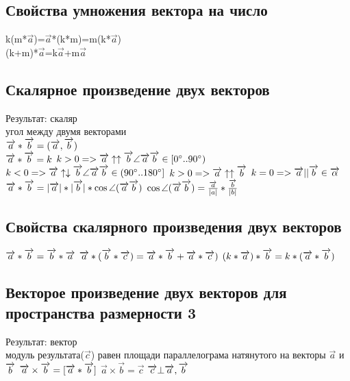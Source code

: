 \documentclass{book}
\begin{document}
\subsection{Свойства умножения вектора на число}
k(m*$\overrightarrow{a}$)=$\overrightarrow{a}$*(k*m)=m(k*$\overrightarrow{a}$)\\
(k+m)*$\overrightarrow{a}$=k$\overrightarrow{a}$+m$\overrightarrow{a}$\\
\subsection{Скалярное произведение двух векторов}
Результат: скаляр\\
угол между двумя векторами\\
$\overrightarrow{a}*\overrightarrow{b}=(\overrightarrow{a},\overrightarrow{b})\\$
\\
$\overrightarrow{a}*\overrightarrow{b}=k\\$
$k>0 => \overrightarrow{a}\uparrow\uparrow\overrightarrow{b}   \angle\overrightarrow{a}\overrightarrow{b}\in[0^\circ..90^\circ)\\$
$k<0 => \overrightarrow{a}\uparrow\downarrow\overrightarrow{b}   \angle\overrightarrow{a}\overrightarrow{b}\in(90^\circ..180^\circ]\\$
$k>0 => \overrightarrow{a}\uparrow\uparrow\overrightarrow{b}\\$
$k=0 => \overrightarrow{a}||\overrightarrow{b}\in \overrightarrow{\alpha }\\$
$\overrightarrow{a}*\overrightarrow{b}=|\overrightarrow{a}|*|\overrightarrow{b}|*\cos\angle(\overrightarrow{a}\overrightarrow{b})\\$
$\cos\angle(\overrightarrow{a}\overrightarrow{b}) = \frac{\overrightarrow{a}}{|a|}*\frac{\overrightarrow{b}}{|b|}\\$
\subsection{Свойства скалярного произведения двух векторов}
$\overrightarrow{a}*\overrightarrow{b}=\overrightarrow{b}*\overrightarrow{a}\\$
$\overrightarrow{a}*(\overrightarrow{b}*\overrightarrow{c})=\overrightarrow{a}*\overrightarrow{b}+\overrightarrow{a}*\overrightarrow{c})\\$
$(k*\overrightarrow{a})*\overrightarrow{b}=k*(\overrightarrow{a}*\overrightarrow{b})\\$
\subsection{Векторое произведение двух векторов для пространства размерности 3}
Результат: вектор\\
модуль результата($\overrightarrow{c}$) равен площади параллелограма натянутого на векторы $\overrightarrow{a}$ и $\overrightarrow{b}\\$
$\overrightarrow{a}\times\overrightarrow{b}=[\overrightarrow{a}*\overrightarrow{b}]\\$
$\overrightarrow{a}\times\overrightarrow{b}=\overrightarrow{c}$
$\overrightarrow{c}\bot\overrightarrow{a},\overrightarrow{b}\\$
\end{document}

